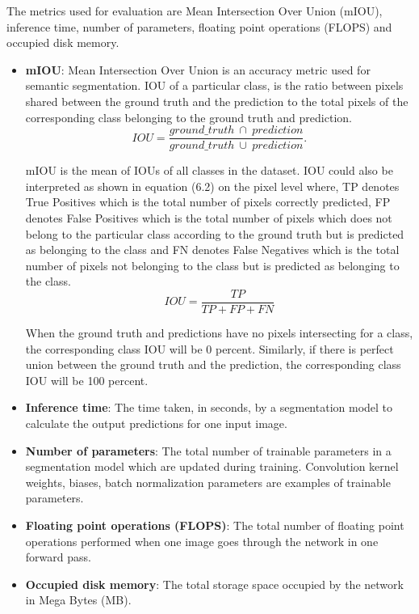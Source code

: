 The metrics used for evaluation are Mean Intersection Over Union (mIOU), inference time, number of parameters, floating point operations (FLOPS) and occupied disk memory. 
	\begin{itemize}
		\item \textbf{mIOU}: Mean Intersection Over Union is an accuracy metric used for semantic segmentation. IOU of a particular class, is the ratio between pixels shared between the ground truth and the prediction to the total pixels of the corresponding class belonging to the ground truth and prediction.
		\begin{equation}
			IOU = \frac{ground\_truth \: \cap \: prediction}{ground\_truth \: \cup \: prediction}.
		\end{equation}
		
		mIOU is the mean of IOUs of all classes in the dataset. IOU could also be interpreted as shown in equation (6.2) on the pixel level where, TP denotes True Positives which is the total number of pixels correctly predicted, FP denotes False Positives which is the total number of pixels which does not belong to the particular class according to the ground truth but is predicted as belonging to the class and FN denotes False Negatives which is the total number of pixels not belonging to the class but is predicted as belonging to the class.
		\begin{equation}
			IOU = \frac{TP}{TP+FP+FN}
		\end{equation}
		
		When the ground truth and predictions have no pixels intersecting for a class, the corresponding class IOU will be 0 percent. Similarly, if there is perfect union between the ground truth and the prediction, the corresponding class IOU will be 100 percent.
		\item \textbf{Inference time}: The time taken, in seconds, by a segmentation model to calculate the output predictions for one input image.
		\item \textbf{Number of parameters}: The total number of trainable parameters in a segmentation model which are updated during training. Convolution kernel weights, biases, batch normalization parameters are examples of trainable parameters.
		\item \textbf{Floating point operations (FLOPS)}: The total number of floating point operations performed when one image goes through the network in one forward pass.
		\item \textbf{Occupied disk memory}: The total storage space occupied by the network in Mega Bytes (MB). 
	\end{itemize}


